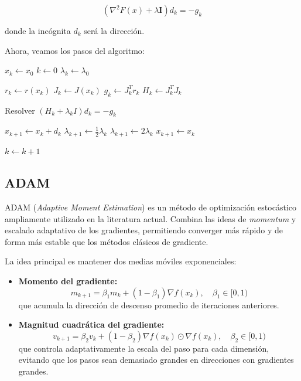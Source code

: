 $$
(\nabla^2 F(x) + \lambda \mathbf{I}) d_k = -g_k
$$

\noindent donde la incógnita $d_k$ será la dirección.

Ahora, veamos los pasos del algoritmo:

\begin{algorithm}[H]
\caption{Algoritmo de Levenberg-Marquardt}
\label{optimizacion_lm_clasico}
\begin{algorithmic}[1]
\State $x_k \gets x_0$
\State $k \gets 0$
\State $\lambda_k \gets \lambda_0$


    \State $r_k \gets r(x_k)$
    \State $J_k \gets J(x_k)$
    \State $g_k \gets J_k^T r_k$
    \State $H_k \gets J_k^T J_k$

    \State Resolver $(H_k + \lambda_k I)d_k = -g_k$

        \State $x_{k+1} \gets x_k + d_k$
        \State $\lambda_{k+1} \gets \frac{1}{2}\lambda_k$
    \Else
        \State $\lambda_{k+1} \gets 2\lambda_k$
        \State $x_{k+1} \gets x_k$
    \EndIf

    \State $k \gets k + 1$

\EndWhile
\end{algorithmic}
\end{algorithm}

\subsection{ADAM}

ADAM (\textit{Adaptive Moment Estimation}) es un método de optimización estocástico ampliamente utilizado en la literatura actual. Combina las ideas de \textit{momentum} y escalado adaptativo de los gradientes, permitiendo converger más rápido y de forma más estable que los métodos clásicos de gradiente.

La idea principal es mantener dos medias móviles exponenciales:  
\begin{itemize}
    \item \textbf{Momento del gradiente:}  
    \[
    m_{k+1} = \beta_1 m_{k} + (1-\beta_1) \nabla f(x_k), \quad \beta_1 \in [0,1)
    \]  
    que acumula la dirección de descenso promedio de iteraciones anteriores.
    \item \textbf{Magnitud cuadrática del gradiente:}  
    \[
    v_{k+1} = \beta_2 v_{k} + (1-\beta_2) \nabla f(x_k) \odot \nabla f(x_k), \quad \beta_2 \in [0,1)
    \]  
    que controla adaptativamente la escala del paso para cada dimensión, evitando que los pasos sean demasiado grandes en direcciones con gradientes grandes.
\end{itemize}

